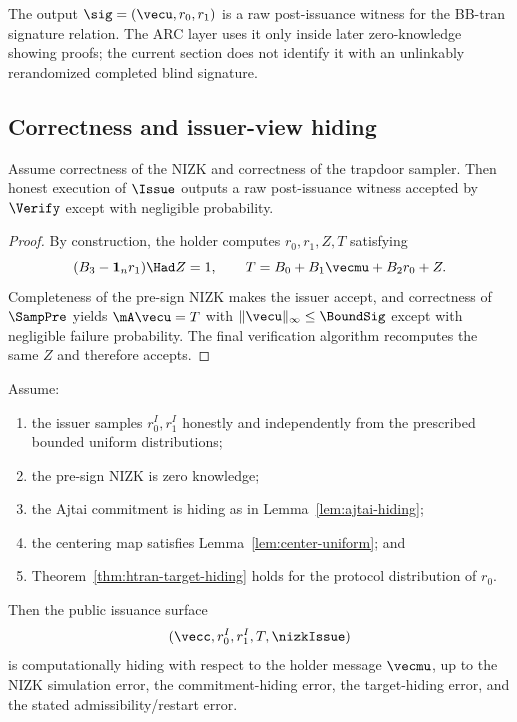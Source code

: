The output $\sig=(\vecu,r_0,r_1)$ is a raw post-issuance witness for the BB-tran signature relation.  The
ARC layer uses it only inside later zero-knowledge showing proofs; the current section does not identify it
with an unlinkably rerandomized completed blind signature.

\subsection{Correctness and issuer-view hiding}
\begin{proposition}[Correctness]\label{prop:bs-correctness-prop}
Assume correctness of the NIZK and correctness of the trapdoor sampler.  Then honest execution of
$\Issue$ outputs a raw post-issuance witness accepted by $\Verify$ except with negligible probability.
\end{proposition}

\begin{proof}
By construction, the holder computes $r_0,r_1,Z,T$ satisfying
\[
  (B_3-\mathbf 1_n r_1)\Had Z=1,
  \qquad
  T=B_0+B_1\vecmu+B_2r_0+Z.
\]
Completeness of the pre-sign NIZK makes the issuer accept, and correctness of $\SampPre$ yields
$\mA\vecu=T$ with $\|\vecu\|_\infty\le \BoundSig$ except with negligible failure probability.  The final
verification algorithm recomputes the same $Z$ and therefore accepts.
\end{proof}

\begin{proposition}\label{prop:bs-issuer-view-hiding}
Assume:
\begin{enumerate}[leftmargin=1.25em]
  \item the issuer samples $r_0^I,r_1^I$ honestly and independently from the prescribed bounded uniform
  distributions;
  \item the pre-sign NIZK is zero knowledge;
  \item the Ajtai commitment is hiding as in Lemma~\ref{lem:ajtai-hiding};
  \item the centering map satisfies Lemma~\ref{lem:center-uniform}; and
  \item Theorem~\ref{thm:htran-target-hiding} holds for the protocol distribution of $r_0$.
\end{enumerate}
Then the public issuance surface
\[
  (\vecc,r_0^I,r_1^I,T,\nizkIssue)
\]
is computationally hiding with respect to the holder message $\vecmu$, up to the NIZK simulation error, the
commitment-hiding error, the target-hiding error, and the stated admissibility/restart error.
\end{proposition}


